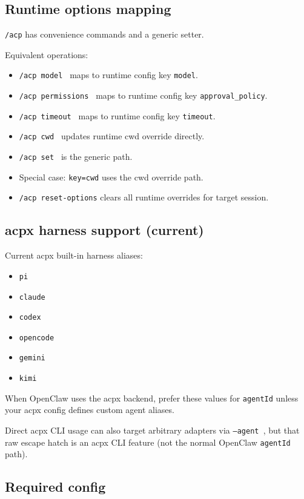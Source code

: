 \subsection{Runtime options mapping}


\texttt{/acp} has convenience commands and a generic setter.

Equivalent operations:

\begin{itemize}
  \item \texttt{/acp model } maps to runtime config key \texttt{model}.
  \item \texttt{/acp permissions } maps to runtime config key \texttt{approval\_policy}.
  \item \texttt{/acp timeout } maps to runtime config key \texttt{timeout}.
  \item \texttt{/acp cwd } updates runtime cwd override directly.
  \item \texttt{/acp set  } is the generic path.
  \item Special case: \texttt{key=cwd} uses the cwd override path.
  \item \texttt{/acp reset-options} clears all runtime overrides for target session.
\end{itemize}


\subsection{acpx harness support (current)}


Current acpx built-in harness aliases:

\begin{itemize}
  \item \texttt{pi}
  \item \texttt{claude}
  \item \texttt{codex}
  \item \texttt{opencode}
  \item \texttt{gemini}
  \item \texttt{kimi}
\end{itemize}


When OpenClaw uses the acpx backend, prefer these values for \texttt{agentId} unless your acpx config defines custom agent aliases.

Direct acpx CLI usage can also target arbitrary adapters via \texttt{--agent }, but that raw escape hatch is an acpx CLI feature (not the normal OpenClaw \texttt{agentId} path).

\subsection{Required config}


